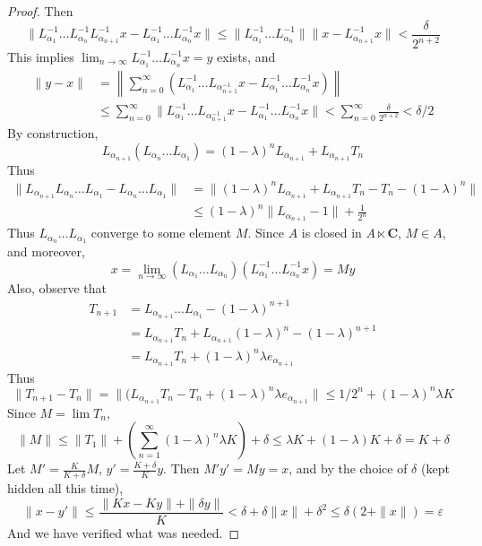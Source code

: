 \begin{proof}
    Then
    \[ \| L_{\alpha_1}^{-1} \dots L_{\alpha_n}^{-1} L_{\alpha_{n+1}}^{-1} x - L_{\alpha_1}^{-1} \dots L_{\alpha_n}^{-1} x \| \leq \| L_{\alpha_1}^{-1} \dots L_{\alpha_n}^{-1} \| \| x - L_{\alpha_{n+1}}^{-1} x \| < \frac{\delta}{2^{n+2}} \]
    This implies $\lim_{n \to \infty} L_{\alpha_1}^{-1} \dots L_{\alpha_n}^{-1} x = y$ exists, and
    \begin{align*}
    \| y - x \| &= \left\| \sum_{n = 0}^\infty (L_{\alpha_1}^{-1} \dots L_{\alpha_{n+1}^{-1}} x - L_{\alpha_1}^{-1} \dots L_{\alpha_n}^{-1} x) \right\|\\
    &\leq \sum_{n = 0}^\infty \| L_{\alpha_1}^{-1} \dots L_{\alpha_{n+1}^{-1}} x - L_{\alpha_1}^{-1} \dots L_{\alpha_n}^{-1} x \| < \sum_{n = 0}^\infty \frac{\delta}{2^{n+2}} < \delta/2
    \end{align*}
    By construction,
    \[ L_{\alpha_{n+1}} (L_{\alpha_n} \dots L_{\alpha_1}) = (1 - \lambda)^n L_{\alpha_{n+1}} + L_{\alpha_{n+1}} T_n \]
    Thus
    \begin{align*}
        \| L_{\alpha_{n+1}} L_{\alpha_n} \dots L_{\alpha_1} - L_{\alpha_n} \dots L_{\alpha_1} \| &= \| (1 - \lambda)^n L_{\alpha_{n+1}} + L_{\alpha_{n+1}} T_n - T_n - (1-  \lambda)^n \|\\
        &\leq (1 - \lambda)^n \| L_{\alpha_{n+1}} - 1 \| + \frac{1}{2^n}
    \end{align*}
    Thus $L_{\alpha_n} \dots L_{\alpha_1}$ converge to some element $M$. Since $A$ is closed in $A \ltimes \mathbf{C}$, $M \in A$, and moreover,
    \[ x = \lim_{n \to \infty} (L_{\alpha_1} \dots L_{\alpha_n}) (L_{\alpha_1}^{-1} \dots L_{\alpha_n}^{-1} x) = My \]
    Also, observe that
    \begin{align*}
        T_{n+1} &= L_{\alpha_{n+1}} \dots L_{\alpha_1} - (1 - \lambda)^{n+1}\\
        &= L_{\alpha_{n+1}} T_n + L_{\alpha_{n+1}} (1 - \lambda)^n - (1 - \lambda)^{n+1}\\
        &= L_{\alpha_{n+1}} T_n + (1 - \lambda)^n \lambda e_{\alpha_{n+1}}
    \end{align*}
    Thus
    \[ \| T_{n+1} - T_n \| = \| (L_{\alpha_{n+1}} T_n - T_n + (1 - \lambda)^n \lambda e_{\alpha_{n+1}} \| \leq 1/2^n + (1 - \lambda)^n \lambda K \]
    Since $M = \lim T_n$,
    \[ \| M \| \leq \| T_1 \| + \left(\sum_{n = 1}^\infty (1 - \lambda)^n \lambda K \right) + \delta \leq \lambda K + (1 - \lambda) K + \delta = K + \delta \]
    Let $M' = \frac{K}{K + \delta} M$, $y' = \frac{K + \delta}{K} y$. Then $M'y' = My = x$, and by the choice of $\delta$ (kept hidden all this time),
    \[ \| x - y' \| \leq \frac{\| Kx - Ky \| + \| \delta y \|}{K} < \delta + \delta \| x \| + \delta^2 \leq \delta(2 + \|x\|) = \varepsilon \]
    And we have verified what was needed.
\end{proof}

